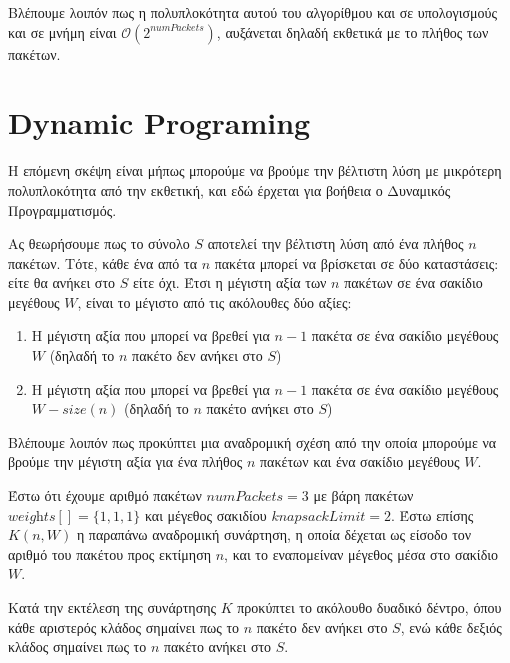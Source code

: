 \documentclass{article}
\begin{document}
Βλέπουμε λοιπόν πως η πολυπλοκότητα αυτού του αλγορίθμου και σε υπολογισμούς και
σε μνήμη είναι $\mathcal{O}\left(2^{\textit{numPackets}}\right)$, αυξάνεται
δηλαδή εκθετικά με το πλήθος των πακέτων.

\section{Dynamic Programing}

Η επόμενη σκέψη είναι μήπως μπορούμε να βρούμε την βέλτιστη λύση με μικρότερη
πολυπλοκότητα από την εκθετική, και εδώ έρχεται για βοήθεια ο Δυναμικός
Προγραμματισμός.

Ας θεωρήσουμε πως το σύνολο $S$ αποτελεί την βέλτιστη λύση από ένα πλήθος $n$
πακέτων. Τότε, κάθε ένα από τα $n$ πακέτα μπορεί να βρίσκεται σε δύο
καταστάσεις: είτε θα ανήκει στο $S$ είτε όχι. Έτσι η μέγιστη αξία των $n$
πακέτων σε ένα σακίδιο μεγέθους $W$, είναι το μέγιστο από τις ακόλουθες δύο
αξίες:

\begin{enumerate}
    \item Η μέγιστη αξία που μπορεί να βρεθεί για $n-1$ πακέτα σε ένα σακίδιο
            μεγέθους $W$ (δηλαδή το $n$ πακέτο δεν ανήκει στο $S$)
    \item Η μέγιστη αξία που μπορεί να βρεθεί για $n-1$ πακέτα σε ένα σακίδιο
            μεγέθους $W-\textit{size}(n)$ (δηλαδή το $n$ πακέτο ανήκει στο $S$)
\end{enumerate}

Βλέπουμε λοιπόν πως προκύπτει μια αναδρομική σχέση από την οποία μπορούμε να
βρούμε την μέγιστη αξία για ένα πλήθος $n$ πακέτων και ένα σακίδιο μεγέθους $W$.

\begin{sloppypar}
Έστω ότι έχουμε αριθμό πακέτων $\textit{numPackets}=3$ με βάρη πακέτων
$\textit{weights}[]=\{1, 1, 1\}$ και μέγεθος σακιδίου
$\textit{knapsackLimit}=2$. Έστω επίσης $K(n, W)$ η παραπάνω αναδρομική
συνάρτηση, η οποία δέχεται ως είσοδο τον αριθμό του πακέτου προς εκτίμηση $n$,
και το εναπομείναν μέγεθος μέσα στο σακίδιο $W$.
\end{sloppypar}

Κατά την εκτέλεση της συνάρτησης $K$ προκύπτει το ακόλουθο δυαδικό δέντρο, όπου
κάθε αριστερός κλάδος σημαίνει πως το $n$ πακέτο δεν ανήκει στο $S$, ενώ
κάθε δεξιός κλάδος σημαίνει πως το $n$ πακέτο ανήκει στο $S$.

\begin{center}
\end{center}
\end{document}
